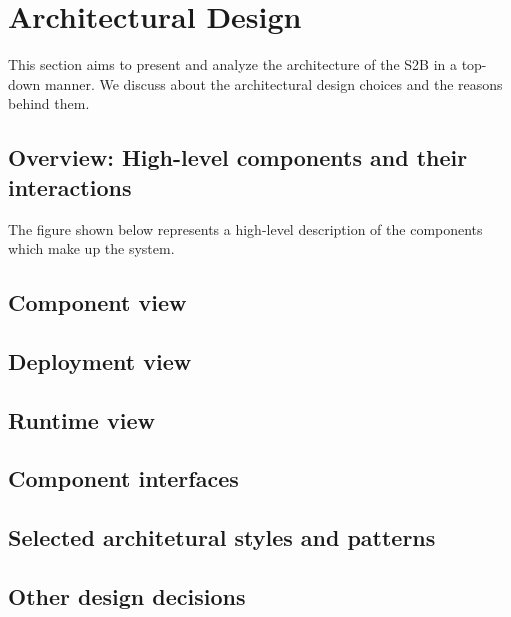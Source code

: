 \chapter{Architectural Design}
This section aims to present and analyze the architecture of the S2B in a top-down manner. 
We discuss about the architectural design choices and the reasons behind them. 

\section{Overview: High-level components and their interactions}
The figure shown below represents a high-level description of the components which make up the system.


\section{Component view}
\section{Deployment view}
\section{Runtime view}
\section{Component interfaces}
\section{Selected architetural styles and patterns}
\section{Other design decisions}

